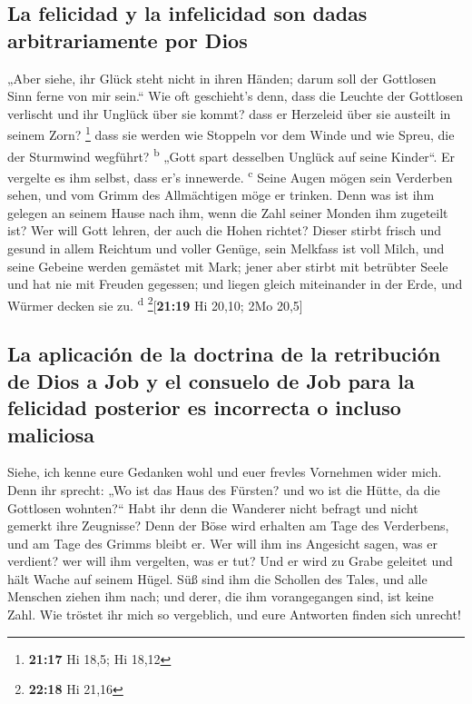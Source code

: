 \hypertarget{la-felicidad-y-la-infelicidad-son-dadas-arbitrariamente-por-dios}{%
\subsection{La felicidad y la infelicidad son dadas arbitrariamente por
Dios}\label{la-felicidad-y-la-infelicidad-son-dadas-arbitrariamente-por-dios}}

 „Aber siehe, ihr Glück steht nicht in ihren Händen;
darum soll der Gottlosen Sinn ferne von mir sein.``  Wie
oft geschieht's denn, dass die Leuchte der Gottlosen verlischt und ihr
Unglück über sie kommt? dass er Herzeleid über sie austeilt in seinem
Zorn? \footnote{\textbf{21:17} Hi 18,5; Hi 18,12}  dass
sie werden wie Stoppeln vor dem Winde und wie Spreu, die der Sturmwind
wegführt? \textsuperscript{b}  „Gott spart desselben
Unglück auf seine Kinder``. Er vergelte es ihm selbst, dass er's
innewerde. \textsuperscript{c}  Seine Augen mögen sein
Verderben sehen, und vom Grimm des Allmächtigen möge er trinken.
 Denn was ist ihm gelegen an seinem Hause nach ihm, wenn
die Zahl seiner Monden ihm zugeteilt ist?  Wer will Gott
lehren, der auch die Hohen richtet?  Dieser stirbt frisch
und gesund in allem Reichtum und voller Genüge,  sein
Melkfass ist voll Milch, und seine Gebeine werden gemästet mit Mark;
 jener aber stirbt mit betrübter Seele und hat nie mit
Freuden gegessen;  und liegen gleich miteinander in der
Erde, und Würmer decken sie zu. \textsuperscript{d}
\footnote{\textbf{22:18} Hi 21,16}{[}\textbf{21:19} Hi 20,10; 2Mo
20,5{]}

\hypertarget{la-aplicaciuxf3n-de-la-doctrina-de-la-retribuciuxf3n-de-dios-a-job-y-el-consuelo-de-job-para-la-felicidad-posterior-es-incorrecta-o-incluso-maliciosa}{%
\subsection{La aplicación de la doctrina de la retribución de Dios a Job
y el consuelo de Job para la felicidad posterior es incorrecta o incluso
maliciosa}\label{la-aplicaciuxf3n-de-la-doctrina-de-la-retribuciuxf3n-de-dios-a-job-y-el-consuelo-de-job-para-la-felicidad-posterior-es-incorrecta-o-incluso-maliciosa}}

 Siehe, ich kenne eure Gedanken wohl und euer frevles
Vornehmen wider mich.  Denn ihr sprecht: „Wo ist das Haus
des Fürsten? und wo ist die Hütte, da die Gottlosen wohnten?{}``
 Habt ihr denn die Wanderer nicht befragt und nicht
gemerkt ihre Zeugnisse?  Denn der Böse wird erhalten am
Tage des Verderbens, und am Tage des Grimms bleibt er. 
Wer will ihm ins Angesicht sagen, was er verdient? wer will ihm
vergelten, was er tut?  Und er wird zu Grabe geleitet und
hält Wache auf seinem Hügel.  Süß sind ihm die Schollen
des Tales, und alle Menschen ziehen ihm nach; und derer, die ihm
vorangegangen sind, ist keine Zahl.  Wie tröstet ihr mich
so vergeblich, und eure Antworten finden sich unrecht!

